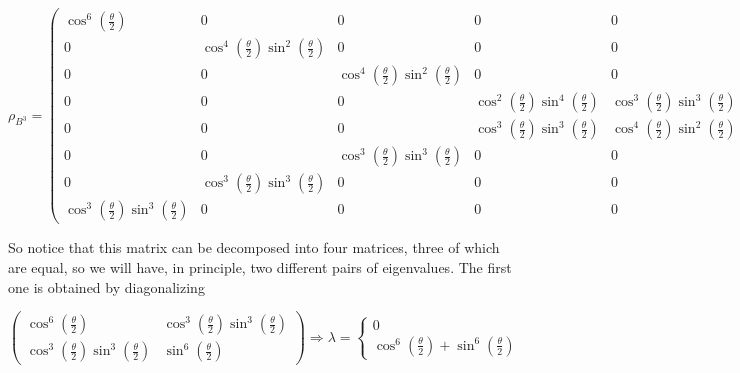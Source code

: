 \documentclass[10]{article}
\begin{document}
$$
\rho_{B^{3}}=\left(\begin{array}{cccccccc}
\cos ^{6}\left(\frac{\theta}{2}\right) & 0 & 0 & 0 & 0 & 0 & 0 & \cos ^{3}\left(\frac{\theta}{2}\right) \sin ^{3}\left(\frac{\theta}{2}\right) \\
0 & \cos ^{4}\left(\frac{\theta}{2}\right) \sin ^{2}\left(\frac{\theta}{2}\right) & 0 & 0 & 0 & 0 & \cos ^{3}\left(\frac{\theta}{2}\right) \sin ^{3}\left(\frac{\theta}{2}\right) & 0 \\
0 & 0 & \cos ^{4}\left(\frac{\theta}{2}\right) \sin ^{2}\left(\frac{\theta}{2}\right) & 0 & 0 & \cos ^{3}\left(\frac{\theta}{2}\right) \sin ^{3}\left(\frac{\theta}{2}\right) & 0 & 0 \\
0 & 0 & 0 & \cos ^{2}\left(\frac{\theta}{2}\right) \sin ^{4}\left(\frac{\theta}{2}\right) & \cos ^{3}\left(\frac{\theta}{2}\right) \sin ^{3}\left(\frac{\theta}{2}\right) & 0 & 0 & 0 \\
0 & 0 & 0 & \cos ^{3}\left(\frac{\theta}{2}\right) \sin ^{3}\left(\frac{\theta}{2}\right) & \cos ^{4}\left(\frac{\theta}{2}\right) \sin ^{2}\left(\frac{\theta}{2}\right) & 0 & 0 & 0 \\
0 & 0 & \cos ^{3}\left(\frac{\theta}{2}\right) \sin ^{3}\left(\frac{\theta}{2}\right) & 0 & 0 & \cos ^{2}\left(\frac{\theta}{2}\right) \sin ^{4}\left(\frac{\theta}{2}\right) & 0 & 0 \\
0 & \cos ^{3}\left(\frac{\theta}{2}\right) \sin ^{3}\left(\frac{\theta}{2}\right) & 0 & 0 & 0 & 0 & \cos ^{2}\left(\frac{\theta}{2}\right) \sin ^{4}\left(\frac{\theta}{2}\right) & 0 \\
\cos ^{3}\left(\frac{\theta}{2}\right) \sin ^{3}\left(\frac{\theta}{2}\right) & 0 & 0 & 0 & 0 & 0 & 0 & \sin ^{6}\left(\frac{\theta}{2}\right)
\end{array}\right)
$$

So notice that this matrix can be decomposed into four matrices, three of which are equal, so we will have, in principle, two different pairs of eigenvalues. The first one is obtained by diagonalizing

$$
\left(\begin{array}{cc}
\cos ^{6}\left(\frac{\theta}{2}\right) & \cos ^{3}\left(\frac{\theta}{2}\right) \sin ^{3}\left(\frac{\theta}{2}\right) \\
\cos ^{3}\left(\frac{\theta}{2}\right) \sin ^{3}\left(\frac{\theta}{2}\right) & \sin ^{6}\left(\frac{\theta}{2}\right)
\end{array}\right) \Rightarrow \lambda=\left\{\begin{array}{l}
0 \\
\cos ^{6}\left(\frac{\theta}{2}\right)+\sin ^{6}\left(\frac{\theta}{2}\right)
\end{array}\right.
$$
\end{document}
